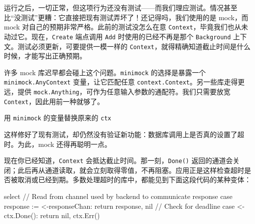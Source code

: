 运行之后，一切正常，但这项行为还没有测试——而我们理应测试。情况甚至比“没测试”更糟：它直接把现有测试弄坏了！还记得吗，我们使用的是 mock，而 mock 对自己的预期非常严格。此前的测试没怎么在意 \texttt{Context}，毕竟我们也从未动过它。现在，\texttt{Create} 端点调用 \texttt{Add} 时使用的已经不再是那个 \texttt{Background} 上下文。测试必须更新，可要提供一模一样的 \texttt{Context}，就得精确知道截止时间是什么时候，才能写出正确预期。

许多 mock 库迟早都会碰上这个问题。\texttt{minimock} 的选择是暴露一个 \texttt{minimock.AnyContext} 变量，让它匹配任意 \texttt{context.Context}。另一些库走得更远，提供 \texttt{mock.Anything}，可作为任意输入参数的通配符。我们只需要放宽 \texttt{Context}，因此用前一种就够了。


\begin{codeannotations}
\item 用 \texttt{minimock} 的变量替换原来的 \texttt{ctx}
\end{codeannotations}

这样修好了现有测试，却仍然没有验证新功能：数据库调用上是否真的设置了超时。为此，mock 还得再聪明一点。

现在你已经知道，\texttt{Context} 会抵达截止时间。那一刻，\texttt{Done()} 返回的通道会关闭；此后再从通道读取，就会立刻取得零值，不再阻塞。应用正是这样检查超时是否被取消或已经到期。多数处理超时的库中，都能见到下面这段代码的某种变体：

\begin{gocode}[]
select {
// Read from channel used by backend to communicate response
case response := <-responseChan:
    return response, nil
// Check for deadline
case <-ctx.Done():
    return nil, ctx.Err()
}
\end{gocode}


